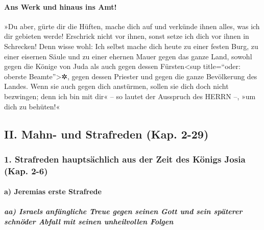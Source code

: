 \hypertarget{ans-werk-und-hinaus-ins-amt}{%
\paragraph{Ans Werk und hinaus ins
Amt!}\label{ans-werk-und-hinaus-ins-amt}}

»Du aber, gürte dir die Hüften, mache dich auf und
verkünde ihnen alles, was ich dir gebieten werde! Erschrick nicht vor
ihnen, sonst setze ich dich vor ihnen in Schrecken! Denn
wisse wohl: Ich selbst mache dich heute zu einer festen Burg, zu einer
eisernen Säule und zu einer ehernen Mauer gegen das ganze Land, sowohl
gegen die Könige von Juda als auch gegen dessen Fürsten\textless sup
title=``oder: oberste Beamte''\textgreater✲, gegen dessen Priester und
gegen die ganze Bevölkerung des Landes. Wenn sie auch
gegen dich anstürmen, sollen sie dich doch nicht bezwingen; denn ich bin
mit dir« -- so lautet der Ausspruch des HERRN --, »um dich zu behüten!«

\hypertarget{ii.-mahn--und-strafreden-kap.-2-29}{%
\subsection{II. Mahn- und Strafreden (Kap.
2-29)}\label{ii.-mahn--und-strafreden-kap.-2-29}}

\hypertarget{strafreden-hauptsuxe4chlich-aus-der-zeit-des-kuxf6nigs-josia-kap.-2-6}{%
\subsubsection{1. Strafreden hauptsächlich aus der Zeit des Königs Josia
(Kap.
2-6)}\label{strafreden-hauptsuxe4chlich-aus-der-zeit-des-kuxf6nigs-josia-kap.-2-6}}

\hypertarget{a-jeremias-erste-strafrede}{%
\paragraph{a) Jeremias erste
Strafrede}\label{a-jeremias-erste-strafrede}}

\hypertarget{aa-israels-anfuxe4ngliche-treue-gegen-seinen-gott-und-sein-spuxe4terer-schnuxf6der-abfall-mit-seinen-unheilvollen-folgen}{%
\subparagraph{aa) Israels anfängliche Treue gegen seinen Gott und sein
späterer schnöder Abfall mit seinen unheilvollen
Folgen}\label{aa-israels-anfuxe4ngliche-treue-gegen-seinen-gott-und-sein-spuxe4terer-schnuxf6der-abfall-mit-seinen-unheilvollen-folgen}}

